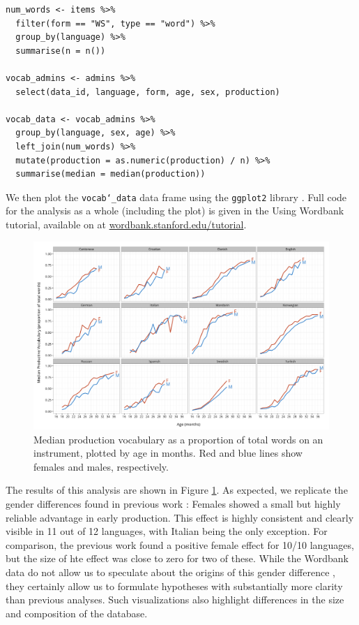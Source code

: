 \documentclass[man,noapacite]{apa}
\begin{document}
\begin{lstlisting}
num_words <- items %>%
  filter(form == "WS", type == "word") %>%
  group_by(language) %>%
  summarise(n = n())

vocab_admins <- admins %>%
  select(data_id, language, form, age, sex, production)

vocab_data <- vocab_admins %>%
  group_by(language, sex, age) %>%
  left_join(num_words) %>%
  mutate(production = as.numeric(production) / n) %>%
  summarise(median = median(production))
\end{lstlisting}

\noindent We then plot the \texttt{vocab\char`_data} data frame using the \texttt{ggplot2} library \cite{wickham2009}. Full code for the analysis as a whole (including the plot) is given in the Using Wordbank tutorial, available on at \url{wordbank.stanford.edu/tutorial}.

\begin{figure}[ht!]
\includegraphics[width=6in]{figures/gender.png}
\caption{\label{fig:gender} Median production vocabulary as a proportion of total words on an instrument, plotted by age in months. Red and blue lines show females and males, respectively.}
\end{figure}

The results of this analysis are shown in Figure \ref{fig:gender}. As expected, we replicate the gender differences found in previous work \cite{eriksson2012}: Females showed a small but highly reliable advantage in early production. This effect is highly consistent and clearly visible in 11 out of 12 languages, with Italian being the only exception. For comparison, the previous work found a positive female effect for 10/10 languages, but the size of hte effect was close to zero for two of these. While the Wordbank data do not allow us to speculate about the origins of this gender difference \cite<for some discussion, see>{eriksson2012}, they certainly allow us to formulate hypotheses with substantially more clarity than previous analyses. Such visualizations also highlight differences in the size and composition of the database.
\end{document}
